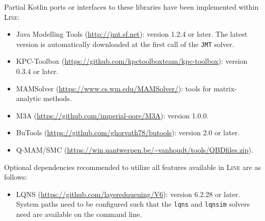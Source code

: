 \begin{KOTLIN}
Partial Kotlin ports or interfaces to these libraries have been implemented within \textsc{Line}:
\end{KOTLIN}
\begin{itemize}
\item Java Modelling Tools (\url{http://jmt.sf.net}): version 1.2.4 or later. The latest version is automatically downloaded at the first call of the \texttt{JMT} solver.
\item KPC-Toolbox (\url{https://github.com/kpctoolboxteam/kpc-toolbox}): version 0.3.4 or later.
\item MAMSolver (\url{https://www.cs.wm.edu/MAMSolver/}): tools for matrix-analytic methods.
\item M3A (\url{https://github.com/imperial-qore/M3A}): version 1.0.0.
\item BuTools (\url{https://github.com/ghorvath78/butools}): version 2.0 or later.
\item Q-MAM/SMC (\url{https://win.uantwerpen.be/~vanhoudt/tools/QBDfiles.zip}).
\end{itemize}

\noindent Optional dependencies recommended to utilize all features available in \textsc{Line} are as follows:
\begin{itemize}
\item LQNS (\url{https://github.com/layeredqueuing/V6}): version 6.2.28 or later. System paths need to be configured such that the \texttt{lqns} and \texttt{lqnsim} solvers need are available on the command line.
\end{itemize}

